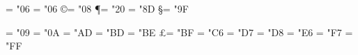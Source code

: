\chardef\dag = "06
\chardef\ddag = "06
\chardef\copyright = "08
\chardef\P = "20
\chardef\bullet = "8D
\chardef\S = "9F

\chardef\registered = "09
\chardef\trademark = "0A
\chardef\perthousand = "AD
\chardef\yen = "BD
\chardef\cents = "BE
\chardef\pounds = "BF
\chardef\florin = "C6
\chardef\currency = "D7
\chardef\degree = "D8
\chardef\compass = "E6
\chardef\male = "F7
\chardef\female = "FF

